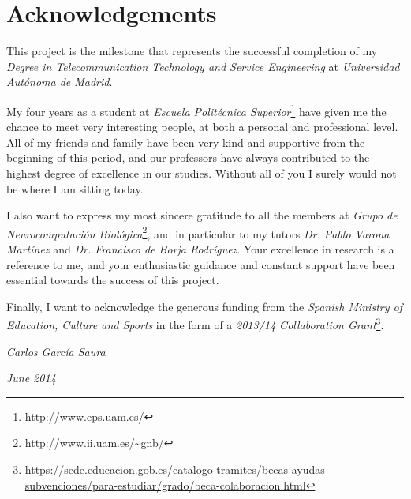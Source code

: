 \chapter*{Acknowledgements}
\vspace{-1cm}

This project is the milestone that represents the successful completion of my \emph{Degree in Telecommunication Technology and Service Engineering} at \emph{Universidad Aut\'{o}noma de Madrid}.

My four years as a student at \emph{Escuela Polit\'{e}cnica Superior}\footnote{\url{http://www.eps.uam.es/}} have given me the chance to meet very interesting people, at both a personal and professional level. All of my friends and family have been very kind and supportive from the beginning of this period, and our professors have always contributed to the highest degree of excellence in our studies.
Without all of you I surely would not be where I am sitting today.

I also want to express my most sincere gratitude to all the members at \emph{Grupo de Neurocomputaci\'{o}n Biol\'{o}gica}\footnote{\url{http://www.ii.uam.es/~gnb/}}, and in particular to my tutors \emph{Dr. Pablo Varona Mart\'{i}nez} and \emph{Dr. Francisco de Borja Rodr\'{i}guez}. Your excellence in research is a reference to me, and your enthusiastic guidance and constant support have been essential towards the success of this project.

Finally, I want to acknowledge the generous funding from the \emph{Spanish Ministry of Education, Culture and Sports} in the form of a \emph{2013/14 Collaboration Grant}\footnote{\url{https://sede.educacion.gob.es/catalogo-tramites/becas-ayudas-subvenciones/para-estudiar/grado/beca-colaboracion.html}}.


\vspace{0.5cm}
\hfill \emph{Carlos Garc\'{i}a Saura}

\hfill \emph{June 2014}

